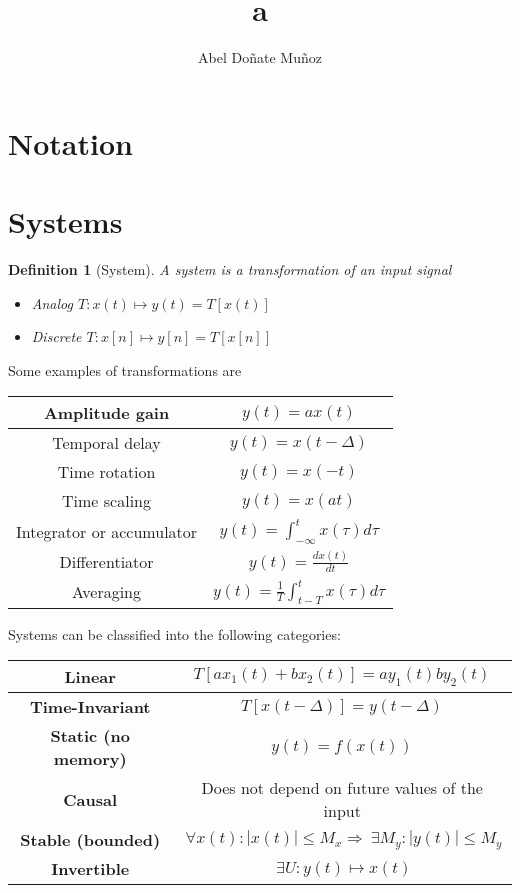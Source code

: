 \documentclass[leqno]{article}
\title{a}
\author{Abel Doñate Muñoz}
\date{}
\newtheorem{definition}[theorem]{Definition}
\begin{document}
\maketitle
\tableofcontents
\newpage

\section{Notation}
\section{Systems}
\begin{definition}[System] A system is a transformation of an input signal
  \begin{itemize}[topsep=-6pt, itemsep=0pt]
    \item Analog $T: x(t) \mapsto y(t) = T[x(t)]$
    \item Discrete $T: x[n] \mapsto y[n] = T[x[n]]$
  \end{itemize}
\end{definition}

Some examples of transformations are
\begin{center}
\begin{tabular}{|c|c|}
\hline
Amplitude gain & $y(t) = ax(t)$\\
\hline
Temporal delay & $y(t)=x(t-\Delta)$\\
\hline
Time rotation & $y(t) = x(-t)$\\
\hline
Time scaling & $y(t) = x(at)$\\
\hline
Integrator or accumulator & $\displaystyle y(t) = \int_{-\infty}^t x(\tau )d\tau$ \\
\hline
Differentiator & $\displaystyle y(t) = \frac{d x(t)}{d t}$ \\
\hline
Averaging & $\displaystyle y(t) = \frac{1}{T} \int_{t-T}^t x(\tau ) d\tau $\\
\hline
\end{tabular}
\end{center}


Systems can be classified into the following categories:
\begin{center}
\begin{tabular}{|c|c|}
\hline
\textbf{Linear} & $T[ax_1(t) + bx_2(t)] = ay_1(t) by_2(t)$ \\
\hline
\textbf{Time-Invariant} & $T[x(t-\Delta )] = y(t-\Delta )$\\
\hline
\textbf{Static (no memory)} & $y(t) = f(x(t))$\\
\hline
\textbf{Causal} & Does not depend on future values of the input\\
\hline
\textbf{Stable (bounded)} & $\ \forall  x(t): |x(t)|\le M_x \Rightarrow \ \exists M_y: |y(t)|\le M_y$ \\
\hline
\textbf{Invertible} & $\ \exists U: y(t)  \mapsto x(t)$ \\
\hline
\end{tabular}
\end{center}
\end{document}

